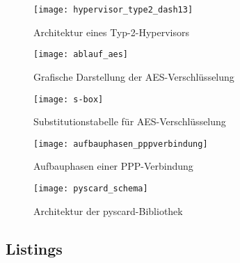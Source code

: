   \begin{figure}[htp]
  \begin{center}
   \texttt{[image: hypervisor\_type2\_dash13]}
  \end{center}
  \caption[Architektur eines Typ-2-Hypervisors]{Architektur eines Typ-2-Hypervisors \cite{dash13}}
  \label{abb:hypervisor_type2}
 \end{figure}

  \begin{figure}[htp]
  \begin{center}
   \texttt{[image: ablauf\_aes]}
  \end{center}
  \caption[Grafische Darstellung der AES-Verschlüsselung]{Grafische Darstellung der AES-Verschlüsselung \cite{paar10}}
  \label{abb:funktion_aes}
 \end{figure}
 
  \begin{figure}[htp]
  \begin{center}
   \texttt{[image: s-box]}
  \end{center}
  \caption[Substitutionstabelle für AES-Verschlüsselung]{Substitutionstabelle für AES-Verschlüsselung \cite{paar10}}
  \label{abb:s-box}
 \end{figure}
 
 \begin{figure}[htp]
  \begin{center}
   \texttt{[image: aufbauphasen\_pppverbindung]}
  \end{center}
  \caption[Aufbauphasen einer PPP-Verbindung]{Aufbauphasen einer PPP-Verbindung \cite{zackercomptia}}
  \label{abb:aufbauphasen_pppverbindung}
 \end{figure}

 \begin{figure}[htp]
  \begin{center}
   \texttt{[image: pyscard\_schema]}
  \end{center}
  \caption[Architektur der pyscard-Bibliothek]{Architektur der pyscard-Bibliothek \cite{pyscardweb}}
  \label{abb:pyscard_schema}
 \end{figure}

 \clearpage

\subsection{Listings}

\label{lst:main.c}
  

